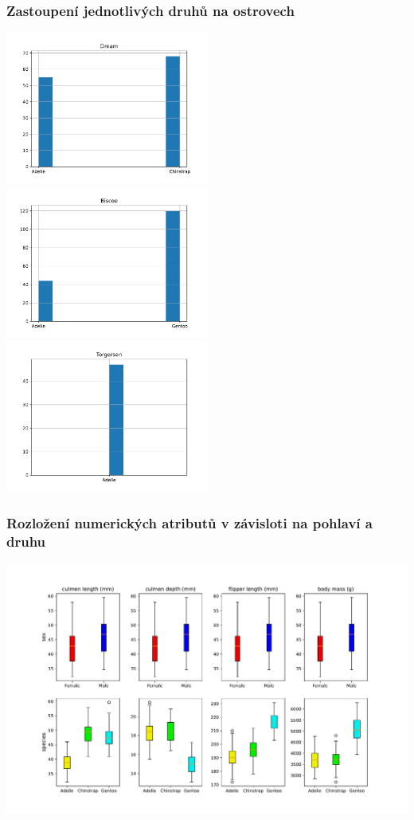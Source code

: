 \documentclass[10pt,xcolor=pdflatex,dvipsnames,table,oneside]{book}
\begin{document}
\subsubsection{Zastoupení jednotlivých druhů na ostrovech}
\includegraphics[width=0.5\textwidth, angle = 0]{img/dream-species.pdf}
\includegraphics[width=0.5\textwidth, angle = 0]{img/biscoe-species.pdf}
\includegraphics[width=0.5\textwidth, angle = 0]{img/torgersen-species.pdf}


\subsubsection{Rozložení numerických atributů v závisloti na pohlaví a druhu}
\includegraphics[width=1.0\textwidth, angle = 0]{img/box.pdf}
\end{document}
